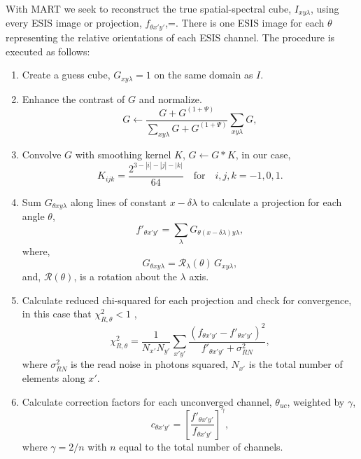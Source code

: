 	With MART we seek to reconstruct the true spatial-spectral cube, $I_{xy\lambda}$, using every ESIS image or projection, $f_{\theta x'y'}$,=. There is one ESIS image for each $\theta$ representing the relative orientations of each ESIS channel. The procedure is executed as follows:
	\begin{enumerate}
		\item \label{step:guess} Create a guess cube, $G_{xy\lambda} = 1$ on the same domain as $I$. 
		\item \label{step:contrast} Enhance the contrast of $G$ and normalize. 
			\begin{equation}
				G \leftarrow \frac{G+G^{(1+\Psi)}}{\sum_{xy\lambda}G+G^{(1+\Psi)}}\sum_{xy\lambda}G, 
			\end{equation}
		
		\item \label{step:smooth} Convolve $G$ with smoothing kernel $K$, $G \leftarrow G * K$,
		in our case,
			\begin{equation}
			\label{eq:kernel}
				K_{ijk} = \frac{2^{3-|i|-|j|-|k|}}{64} \quad \text{for}\quad i,j,k = -1,0,1.
			\end{equation}
		
		\item \label{step:project} Sum $G_{\theta xy\lambda}$ along lines of constant $x-\delta\lambda$ to calculate a projection for each angle $\theta$,
			\begin{equation}
				f'_{\theta x'y'} = \sum_\lambda G_{\theta(x-\delta\lambda)y\lambda}, 
			\end{equation}
		where,
			\begin{equation}
				G_{\theta xy\lambda} = \mathcal{R}_\lambda(\theta)\,G_{xy\lambda},
			\end{equation} 
		and, $\mathcal{R}(\theta)$, is a rotation about the $\lambda$ axis. 	
		
		\item \label{step:chisquared} Calculate reduced chi-squared for each projection and check for convergence, in this case that $\chi_{R,\theta}^2 < 1$ , 
			\begin{equation}
				\chi_{R,\theta}^2 = \frac{1}{N_{x'} N_{y'}}\sum_{x'y'} \frac{(f_{\theta x'y'}-f'_{\theta x'y'})^2}{f'_{\theta x'y'}+\sigma^2_{RN}},
			\end{equation}
		where $\sigma^2_{RN}$ is the read noise in photons squared, $N_{x'}$ is the total number of elements along $x'$.
		
		\item Calculate correction factors for each unconverged channel, $\theta_{uc}$, weighted by $\gamma$, 
			\begin{equation} \label{eq:correctionfactor}
				c_{\theta x'y'} = \left[\frac{f'_{\theta x'y'}}{f_{\theta x'y'}}\right]^\gamma,
			\end{equation}
		where $\gamma = 2/n$ with $n$ equal to the total number of channels.
		

\end{enumerate}
